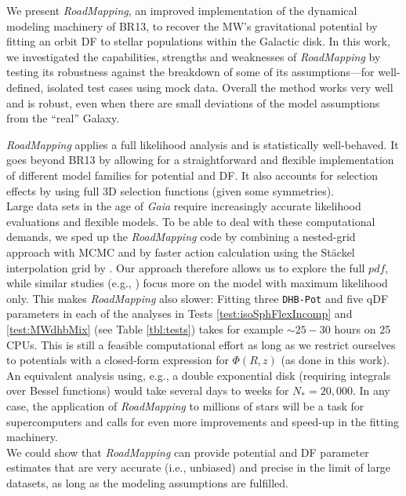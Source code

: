 \documentclass[iop,revtex4,numberedappendix,appendixfloats]{emulateapj}
\newcommand{\pdf}{\ensuremath{pdf}}
\newcommand{\RM}{{\sl RoadMapping}}
\begin{document}
We present \RM{}, an improved implementation of the dynamical modeling machinery of BR13, to recover the MW's gravitational potential by fitting an orbit DF to stellar populations within the Galactic disk. In this work, we investigated the capabilities, strengths and weaknesses of \RM{} by testing its robustness against the breakdown of some of its assumptions---for well-defined, isolated test cases using mock data. Overall the method works very well and is robust, even when there are small deviations of the model assumptions from the ``real'' Galaxy.

\RM{} applies a full likelihood analysis and is statistically well-behaved. It goes beyond BR13 by allowing for a straightforward and flexible implementation of different model families for potential and DF. It also accounts for selection effects by using full 3D selection functions (given some symmetries).\\

 Large data sets in the age of \emph{Gaia} require increasingly accurate likelihood evaluations and flexible models. To be able to deal with these computational demands, we sped up the \RM{} code by combining a nested-grid approach with MCMC and by faster action calculation using the St\"{a}ckel \citep{2012MNRAS.426.1324B} interpolation grid by \citet{2015ApJS..216...29B}. Our approach therefore allows us to explore the full \pdf{}, while similar studies (e.g., \citealt{2014MNRAS.445.3133P,2015MNRAS.449.3479S,2016MNRAS.tmp..817D}) focus more on the model with maximum likelihood only. This makes \RM{} also slower: Fitting three \texttt{DHB-Pot} and five qDF parameters in each of the analyses in Tests \ref{test:isoSphFlexIncomp} and \ref{test:MWdhbMix} (see Table \ref{tbl:tests}) takes for example $\sim 25-30$ hours on 25 CPUs. This is still a feasible computational effort as long as we restrict ourselves to potentials with a closed-form expression for $\Phi(R,z)$ (as done in this work). An equivalent analysis using, e.g., a double exponential disk (requiring integrals over Bessel functions) would take several days to weeks for $N_*=20,000$. In any case, the application of \RM{} to millions of stars will be a task for supercomputers and calls for even more improvements and speed-up in the fitting machinery.\\

 We could show that \RM{} can provide potential and DF parameter estimates that are very accurate (i.e., unbiased) and precise in the limit of large datasets, as long as the modeling assumptions are fulfilled.
\end{document}
